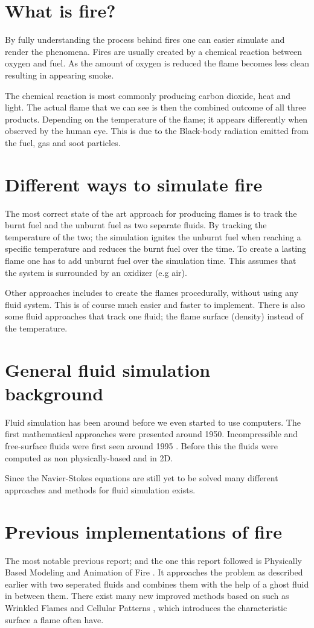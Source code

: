 \section{What is fire?}
By fully understanding the process behind fires one can easier simulate and render the phenomena. Fires are usually created by a chemical reaction between oxygen and fuel. As the amount of oxygen is reduced the flame becomes less clean resulting in appearing smoke. 

The chemical reaction is most commonly producing carbon dioxide, heat and light. The actual flame that we can see is then the combined outcome of all three products. Depending on the temperature of the flame; it appears differently when observed by the human eye. This is due to the Black-body radiation emitted from the fuel, gas and soot particles.

\section{Different ways to simulate fire}
The most correct state of the art approach for producing flames is to track the burnt fuel and the unburnt fuel as two separate fluids. By tracking the temperature of the two; the simulation ignites the unburnt fuel when reaching a specific temperature and reduces the burnt fuel over the time. To create a lasting flame one has to add unburnt fuel over the simulation time. This assumes that the system is surrounded by an oxidizer (e.g air).

Other approaches includes to create the flames procedurally, without using any fluid system. This is of course much easier and faster to implement. There is also some fluid approaches that track one fluid; the flame surface (density) instead of the temperature.

\section{General fluid simulation background}
Fluid simulation has been around before we even started to use computers. The first mathematical approaches were presented around 1950. Incompressible and free-surface fluids were first seen around 1995 \cite{foster}. Before this the fluids were computed as non physically-based and in 2D.

Since the Navier-Stokes equations are still yet to be solved many different approaches and methods for fluid simulation exists.

\section{Previous implementations of fire}
The most notable previous report; and the one this report followed is Physically Based Modeling and Animation of Fire \cite{Nguyen02}. It approaches the problem as described earlier with two seperated fluids and combines them with the help of a ghost fluid in between them. There exist many new improved methods based on \cite{Nguyen02} such as Wrinkled Flames and Cellular Patterns \cite{wrinkled}, which introduces the characteristic surface a flame often have.